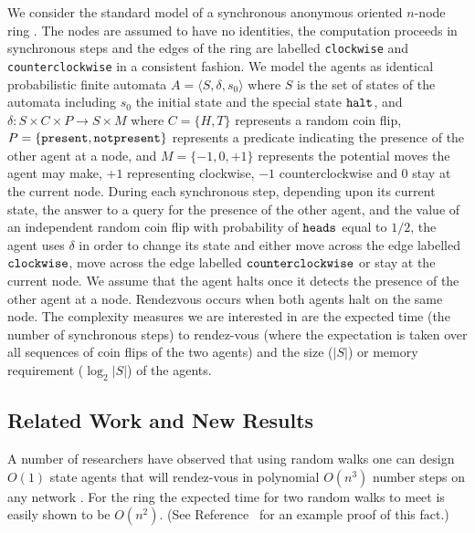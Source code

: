 \documentclass[acmtoalg]{acmtrans2m}
\begin{document}
We consider the standard model of a synchronous anonymous oriented
$n$-node ring \cite{santoro}. The nodes are assumed to have no identities,
the computation proceeds in synchronous steps and the edges of the ring
are labelled {\tt clockwise} and {\tt counterclockwise} in a consistent
fashion.  We model the agents as identical probabilistic finite automata
$A = \langle S, \delta, s_0 \rangle$ where $S$ is the set of states of
the automata including $s_0$ the initial state and the special state ${\tt
halt}$, and $\delta:S \times C \times P \to S \times M$ where $C = \{ H,
T \}$ represents a random coin flip, $P = \{ \tt present, notpresent \}$
represents a predicate indicating the presence of the other agent at a
node, and $M = \{ -1, 0, +1 \}$ represents the potential moves the agent
may make, $+1$ representing clockwise, $-1$ counterclockwise and $0$
stay at the current node.  During each synchronous step, depending upon
its current state, the answer to a query for the presence of the other
agent, and the value of an independent random coin flip with probability
of $\tt heads$ equal to $1/2$, the agent uses $\delta$ in order to change
its state and either move across the edge labelled $\tt clockwise$, move
across the edge labelled $\tt counterclockwise$ or stay at the current
node. We assume that the agent halts once it detects the presence of
the other agent at a node.  Rendezvous occurs when both agents halt on
the same node.  The complexity measures  we are interested in are the
expected time (the number of synchronous steps) to rendez-vous (where the
expectation is taken over all sequences of coin flips of the two agents)
and the size ($|S|$) or memory requirement ($\log_2 |S|$) of the agents.

\subsection{Related Work and New Results}

A number of researchers have observed that using random walks one can
design $O(1)$ state agents that will rendez-vous in polynomial $O(n^3)$
number steps on any network \cite{coppersmith}. For the ring the expected
time for two random walks to meet is easily shown to be $O(n^2)$. (See
Reference~\cite{kk} for an example proof of this fact.)
\end{document}
